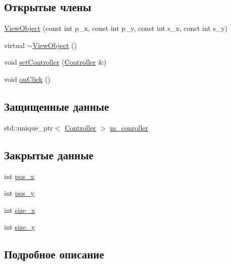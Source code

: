 \subsection*{Открытые члены}
\begin{DoxyCompactItemize}
\item 
\hyperlink{class_view_object_ad27ccab8cf4c80453b30662db99791fe}{View\-Object} (const int p\-\_\-x, const int p\-\_\-y, const int s\-\_\-x, const int s\-\_\-y)
\item 
virtual \hyperlink{class_view_object_a64ed22a30924b733a2ea3d4d4768a2eb}{$\sim$\-View\-Object} ()
\item 
void \hyperlink{class_view_object_a6eea2ef2da8adbf3dd619c11d98f17f5}{set\-Controller} (\hyperlink{class_controller}{Controller} \&)
\item 
void \hyperlink{class_view_object_a55bd898aab839a0729a8f82a7ddd4c66}{on\-Click} ()
\end{DoxyCompactItemize}
\subsection*{Защищенные данные}
\begin{DoxyCompactItemize}
\item 
std\-::unique\-\_\-ptr$<$ \hyperlink{class_controller}{Controller} $>$ \hyperlink{class_view_object_a789d23851e93ed1bd9b1be1bd5544bbd}{m\-\_\-conroller}
\end{DoxyCompactItemize}
\subsection*{Закрытые данные}
\begin{DoxyCompactItemize}
\item 
int \hyperlink{class_view_object_a8759396c35582ac724b320133b9be326}{pos\-\_\-x}
\item 
int \hyperlink{class_view_object_a0a3348dc8dc5d381b319075ad7ea44d9}{pos\-\_\-y}
\item 
int \hyperlink{class_view_object_a484420a1d615725e2d0cdb84d18bcb0a}{size\-\_\-x}
\item 
int \hyperlink{class_view_object_a5373493aa3161f641a30d999790fa06f}{size\-\_\-y}
\end{DoxyCompactItemize}


\subsection{Подробное описание}


